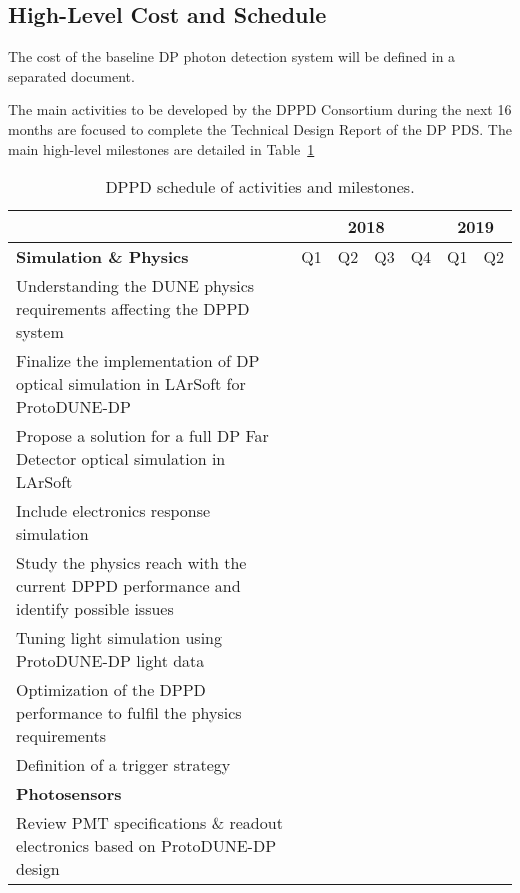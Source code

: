 \subsection{High-Level Cost and Schedule}
\label{sec:fddp-pd-12.4}

The cost of the baseline DP photon detection system will be defined in a separated document.

The main activities to be developed by the DPPD Consortium during the next 16 months are focused to complete the Technical Design Report of the DP PDS. The main high-level milestones are detailed in Table~\ref{tab:dppd_t_12_4}

\begin{table}[htpb] \label{tab:dppd_t_12_4}
\scriptsize
\begin{center}
\caption{DPPD schedule of activities and milestones.}
\begin{tabular}{|l|c|c|c|c|c|c|}
\hline
 &  \multicolumn{4}{c|}{2018} & \multicolumn{2}{|c|}{2019} \\ \hline
{\bf Simulation \& Physics} & Q1 & Q2 & Q3 & Q4 & Q1 & Q2\\
\hline
Understanding the DUNE physics requirements affecting the DPPD system & & \cellcolor{gray} & & & & \\ \hline
Finalize the implementation of DP optical simulation in LArSoft for ProtoDUNE-DP & &  \cellcolor{gray} & & & & \\ \hline
Propose a solution for a full DP Far Detector optical simulation in LArSoft & & &  \cellcolor{gray} & & & \\ \hline
Include electronics response simulation & & &  \cellcolor{gray} & & & \\ \hline
Study the physics reach with the current DPPD performance and identify possible issues & & & &  \cellcolor{gray} & & \\ \hline
Tuning light simulation using ProtoDUNE-DP light data & & & & &  \cellcolor{gray} & \\ \hline
Optimization of the DPPD performance to fulfil the physics requirements & & & & & &  \cellcolor{gray} \\ \hline
Definition of a trigger strategy & & & & & &  \cellcolor{gray} \\ \hline
 \multicolumn{7}{|l|}{\bf Photosensors} \\
\hline
Review PMT specifications \& readout electronics based on ProtoDUNE-DP design & &  \cellcolor{gray} & & & & \\ \hline

\end{tabular}
\end{center}
\end{table}
